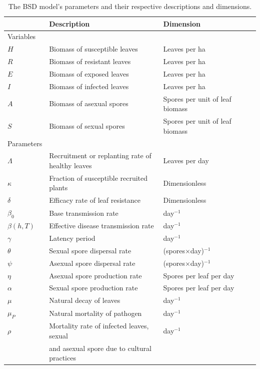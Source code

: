 \documentclass[11pt]{article}
\numberwithin{equation}{section}
\begin{document}
\begin{table}[!ht]
    \caption{The BSD model's parameters and their respective descriptions and dimensions.}
    \label{table1}
    \begin{tabular}{lllll@{}}
        \toprule
        &Description & Dimension\\
        \midrule
        Variables & \\
        $H$ & Biomass of susceptible leaves & Leaves per ha\\
        $R$ & Biomass of resistant leaves   & Leaves per ha\\
        $E$ & Biomass of exposed leaves     & Leaves per ha\\
        $I$ & Biomass of infected leaves    & Leaves per ha\\
        $A$ & Biomass of asexual spores     & Spores per unit of leaf biomass\\
        $S$ & Biomass of sexual spores      & Spores per unit of leaf biomass\\
        Parameters & \\
        $\Lambda$  & Recruitment or replanting rate of healthy leaves & Leaves per day\\
        $\kappa$  & Fraction of susceptible recruited plants & Dimensionless \\
        $\delta$   & Efficacy rate of leaf resistance & Dimensionless \\
        $\beta_0$ & Base transmission rate & day$^{-1}$\\
        $\beta(h,T)$  & Effective disease transmission rate & day$^{-1}$\\
        $\gamma$   & Latency period & day$^{-1}$\\
        $\theta$    & Sexual spore dispersal rate & (spores$\times$day)$^{-1}$\\
        $\psi$ & Asexual spore dispersal rate & (spores$\times$day)$^{-1}$\\
        $\eta$   & Asexual spore production rate & Spores per leaf per day\\
        $\alpha$ & Sexual spore production rate & Spores per leaf per day\\
        $\mu$      & Natural decay of leaves & day$^{-1}$\\
        $\mu_P$    & Natural mortality of pathogen & day$^{-1}$\\
        $\rho$     & Mortality rate of infected leaves, sexual & day$^{-1}$\\
        & and asexual spore due to cultural practices&\\

\end{tabular}
\end{table}
\end{document}

